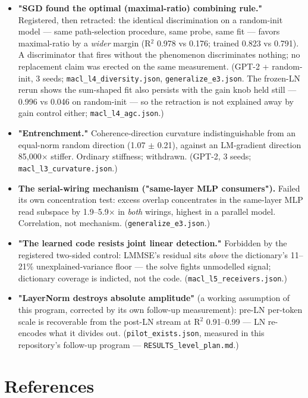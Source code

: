 \documentclass[10pt]{article}
\begin{document}
\begin{itemize}\setlength\itemsep{1pt}
\item \textbf{"SGD found the optimal (maximal-ratio) combining rule."} Registered, then retracted: the identical discrimination on a random-init model --- same path-selection procedure, same probe, same fit --- favors maximal-ratio by a \emph{wider} margin (R$^{2}$ 0.978 vs 0.176; trained 0.823 vs 0.791). A discriminator that fires without the phenomenon discriminates nothing; no replacement claim was erected on the same measurement. (GPT-2 + random-init, 3 seeds; \texttt{macl\_l4\_diversity.json}, \texttt{generalize\_e3.json}. The frozen-LN rerun shows the sum-shaped fit also persists with the gain knob held still --- 0.996 vs 0.046 on random-init --- so the retraction is not explained away by gain control either; \texttt{macl\_l4\_agc.json}.)
\item \textbf{"Entrenchment."} Coherence-direction curvature indistinguishable from an equal-norm random direction (1.07 $\pm$ 0.21), against an LM-gradient direction 85,000$\times$ stiffer. Ordinary stiffness; withdrawn. (GPT-2, 3 seeds; \texttt{macl\_l3\_curvature.json}.)
\item \textbf{The serial-wiring mechanism ("same-layer MLP consumers").} Failed its own concentration test: excess overlap concentrates in the same-layer MLP read subspace by 1.9--5.9$\times$ in \emph{both} wirings, highest in a parallel model. Correlation, not mechanism. (\texttt{generalize\_e3.json}.)
\item \textbf{"The learned code resists joint linear detection."} Forbidden by the registered two-sided control: LMMSE's residual sits \emph{above} the dictionary's 11--21\% unexplained-variance floor --- the solve fights unmodelled signal; dictionary coverage is indicted, not the code. (\texttt{macl\_l5\_receivers.json}.)
\item \textbf{"LayerNorm destroys absolute amplitude"} (a working assumption of this program, corrected by its own follow-up measurement): pre-LN per-token scale is recoverable from the post-LN stream at R$^{2}$ 0.91--0.99 --- LN re-encodes what it divides out. (\texttt{pilot\_exists.json}, measured in this repository's follow-up program --- \texttt{RESULTS\_level\_plan.md}.)
\end{itemize}
\section{References}
\end{document}
